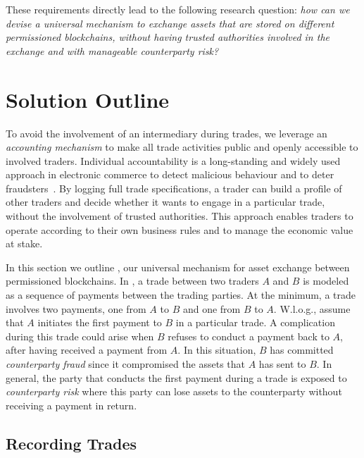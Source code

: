 These requirements directly lead to the following research question: \emph{how can we devise a universal mechanism to exchange assets that are stored on different permissioned blockchains, without having trusted authorities involved in the exchange and with manageable counterparty risk?}

\section{Solution Outline}
\label{sec:solution_outline}
To avoid the involvement of an intermediary during trades, we leverage an \emph{accounting mechanism} to make all trade activities public and openly accessible to involved traders.
Individual accountability is a long-standing and widely used approach in electronic commerce to detect malicious behaviour and to deter fraudsters~\cite{kailar1996accountability,de2018real}.
By logging full trade specifications, a trader can build a profile of other traders and decide whether it wants to engage in a particular trade, without the involvement of trusted authorities.
This approach enables traders to operate according to their own business rules and to manage the economic value at stake.

In this section we outline \ModelName{}, our universal mechanism for asset exchange between permissioned blockchains.
In \ModelName{}, a trade between two traders $ A $ and $ B $ is modeled as a sequence of payments between the trading parties.
At the minimum, a trade involves two payments, one from $ A $ to $ B $ and one from $ B $ to $ A $.
W.l.o.g., assume that $ A $ initiates the first payment to $ B $ in a particular trade.
A complication during this trade could arise when $ B $ refuses to conduct a payment back to $ A $, after having received a payment from $ A $.
In this situation, $ B $ has committed \emph{counterparty fraud} since it compromised the assets that $ A $ has sent to $ B $.
In general, the party that conducts the first payment during a trade is exposed to \emph{counterparty risk} where this party can lose assets to the counterparty without receiving a payment in return.

\subsection{Recording Trades}

